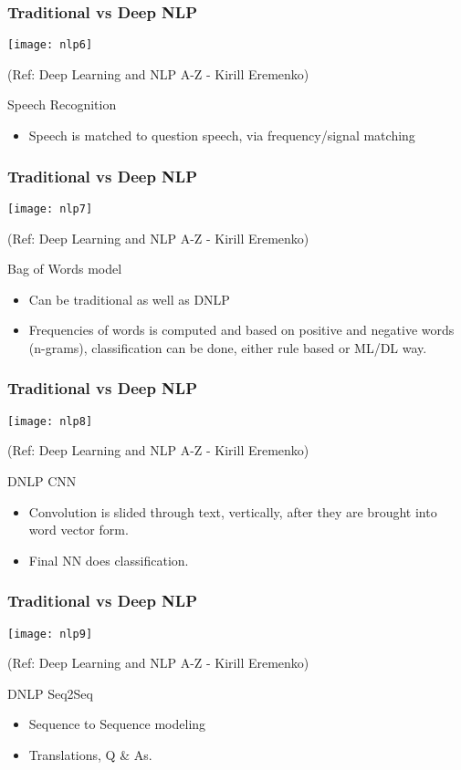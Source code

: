 \begin{frame}[fragile]\frametitle{Traditional vs Deep NLP}
\begin{center}
\texttt{[image: nlp6]}

\tiny{(Ref: Deep Learning and NLP A-Z - Kirill Eremenko)}
\end{center}
Speech Recognition
	\begin{itemize}
	\item Speech is matched to question speech, via frequency/signal matching
	\end{itemize}
	

\end{frame}

\begin{frame}[fragile]\frametitle{Traditional vs Deep NLP}
\begin{center}
\texttt{[image: nlp7]}

\tiny{(Ref: Deep Learning and NLP A-Z - Kirill Eremenko)}
\end{center}
Bag of Words model
	\begin{itemize}
	\item Can be traditional as well as DNLP
	\item Frequencies of words is computed and based on positive and negative words (n-grams), classification can be done, either rule based or ML/DL way.
	\end{itemize}
\end{frame}

\begin{frame}[fragile]\frametitle{Traditional vs Deep NLP}
\begin{center}
\texttt{[image: nlp8]}

\tiny{(Ref: Deep Learning and NLP A-Z - Kirill Eremenko)}
\end{center}
DNLP CNN 
	\begin{itemize}
	\item Convolution is slided through text, vertically, after they are brought into word vector form.
	\item Final NN does classification.
	\end{itemize}
\end{frame}

\begin{frame}[fragile]\frametitle{Traditional vs Deep NLP}
\begin{center}
\texttt{[image: nlp9]}

\tiny{(Ref: Deep Learning and NLP A-Z - Kirill Eremenko)}
\end{center}
DNLP Seq2Seq 
	\begin{itemize}
	\item Sequence to Sequence modeling
	\item Translations, Q \& As.
	\end{itemize}
\end{frame}


